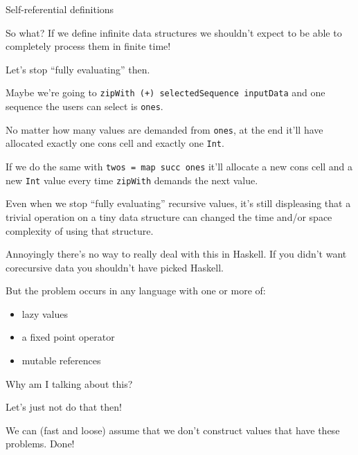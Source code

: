 \documentclass[ignorenonframetext]{beamer}
\providecommand{\tightlist}{%
  \setlength{\itemsep}{0pt}\setlength{\parskip}{0pt}}
\begin{document}
\begin{frame}{Self-referential definitions}
\begin{frame}[fragile]
\end{frame}

\begin{frame}

So what? If we define infinite data structures we shouldn’t expect to be
able to completely process them in finite time!

\end{frame}

\begin{frame}[fragile]

Let’s stop “fully evaluating” then.

Maybe we’re going to \texttt{zipWith\ (+)\ selectedSequence\ inputData}
and one sequence the users can select is \texttt{ones}.

No matter how many values are demanded from \texttt{ones}, at the end
it’ll have allocated exactly one cons cell and exactly one \texttt{Int}.

If we do the same with \texttt{twos\ =\ map\ succ\ ones} it’ll allocate
a new cons cell and a new \texttt{Int} value every time \texttt{zipWith}
demands the next value.

Even when we stop “fully evaluating” recursive values, it’s still
displeasing that a trivial operation on a tiny data structure can
changed the time and/or space complexity of using that structure.

\end{frame}

\begin{frame}

Annoyingly there’s no way to really deal with this in Haskell. If you
didn’t want corecursive data you shouldn’t have picked Haskell.

But the problem occurs in any language with one or more of:

\begin{itemize}
\tightlist
\item
  lazy values
\item
  a fixed point operator
\item
  mutable references
\end{itemize}

\end{frame}

\begin{frame}{%
\protect\hypertarget{why-am-i-talking-about-this}{%
Why am I talking about this?}}

Let’s just not do that then!

We can (fast and loose) assume that we don’t construct values that have
these problems. Done!


\end{frame}
\end{frame}
\end{document}
